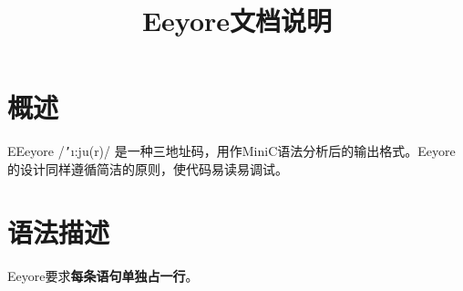 \documentclass{ctexart}
\title{Eeyore文档说明}
\date{}
\author{}
\begin{document}
\maketitle

\section{概述}
EEeyore /\texttt{'}\i:ju\textschwa(r)/ 是一种三地址码，用作MiniC语法分析后的输出格式。Eeyore的设计同样遵循简洁的原则，使代码易读易调试。



\section{语法描述}
Eeyore要求\textbf{每条语句单独占一行}。
\end{document}
